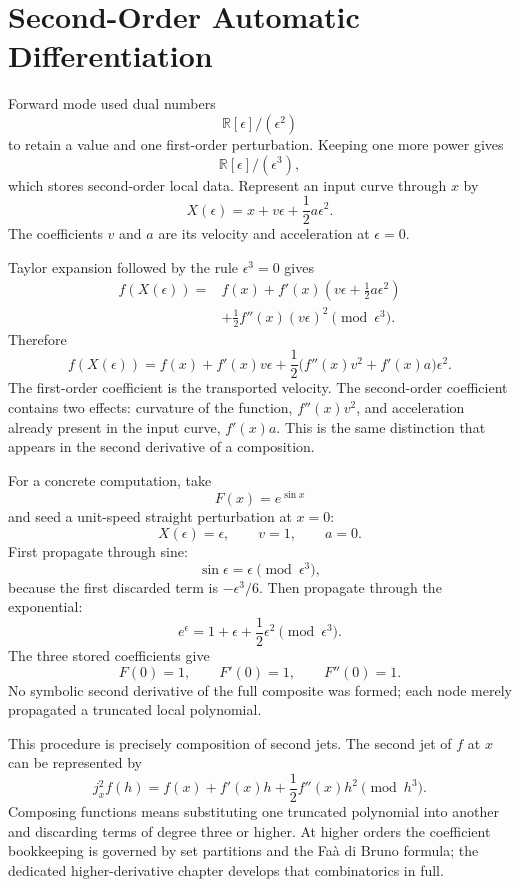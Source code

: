 \section{Second-Order Automatic Differentiation}

Forward mode used dual numbers
\[
  \mathbb R[\epsilon]/(\epsilon^2)
\]
to retain a value and one first-order perturbation.  Keeping one more power gives
\[
  \mathbb R[\epsilon]/(\epsilon^3),
\]
which stores second-order local data.  Represent an input curve through \(x\) by
\[
  X(\epsilon)
  =x+v\epsilon+\frac12a\epsilon^2.
\]
The coefficients \(v\) and \(a\) are its velocity and acceleration at \(\epsilon=0\).

Taylor expansion followed by the rule \(\epsilon^3=0\) gives
\[
\begin{aligned}
  f(X(\epsilon))
  ={}&f(x)
   +f'(x)\left(v\epsilon+\frac12a\epsilon^2\right)\\
   &+\frac12f''(x)(v\epsilon)^2
   \pmod{\epsilon^3}.
\end{aligned}
\]
Therefore
\[
  \boxed{
  f(X(\epsilon))
  =f(x)+f'(x)v\epsilon
  +\frac12\bigl(f''(x)v^2+f'(x)a\bigr)\epsilon^2.}
\]
The first-order coefficient is the transported velocity.  The second-order coefficient contains two effects: curvature of the function, \(f''(x)v^2\), and acceleration already present in the input curve, \(f'(x)a\).  This is the same distinction that appears in the second derivative of a composition.

For a concrete computation, take
\[
  F(x)=e^{\sin x}
\]
and seed a unit-speed straight perturbation at \(x=0\):
\[
  X(\epsilon)=\epsilon,
  \qquad v=1,
  \qquad a=0.
\]
First propagate through sine:
\[
  \sin\epsilon=\epsilon\pmod{\epsilon^3},
\]
because the first discarded term is \(-\epsilon^3/6\).  Then propagate through the exponential:
\[
  e^{\epsilon}
  =1+\epsilon+\frac12\epsilon^2
  \pmod{\epsilon^3}.
\]
The three stored coefficients give
\[
  F(0)=1,
  \qquad
  F'(0)=1,
  \qquad
  F''(0)=1.
\]
No symbolic second derivative of the full composite was formed; each node merely propagated a truncated local polynomial.

This procedure is precisely composition of second jets.  The second jet of \(f\) at \(x\) can be represented by
\[
  j_x^2f(h)
  =f(x)+f'(x)h+\frac12f''(x)h^2
  \pmod{h^3}.
\]
Composing functions means substituting one truncated polynomial into another and discarding terms of degree three or higher.  At higher orders the coefficient bookkeeping is governed by set partitions and the Fa\`a di Bruno formula; the dedicated higher-derivative chapter develops that combinatorics in full.

